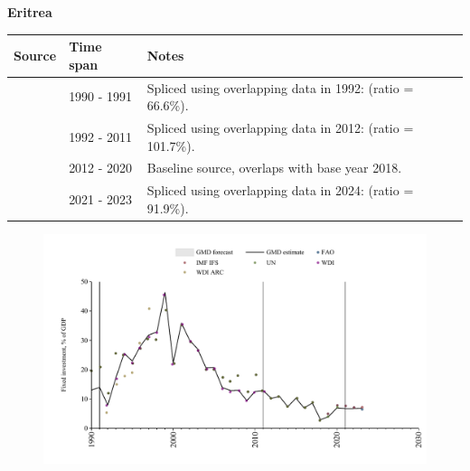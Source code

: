 \documentclass[12pt,a4paper,landscape]{article}
\begin{document}
\begin{adjustbox}{max totalsize={\paperwidth}{\paperheight},center}
\begin{minipage}[t][\textheight][t]{\textwidth}
\vspace*{0.5cm}
{}
\begin{center}
{\Large\bfseries Eritrea}
\end{center}
\vspace{0.5cm}
\begin{table}[H]
\centering
\small
\begin{tabular}{|l|l|l|}
\hline
\textbf{Source} & \textbf{Time span} & \textbf{Notes} \\
\hline
\rowcolor{white}\cite{UN}& 1990 - 1991 &Spliced using overlapping data in 1992: (ratio = 66.6\%).\\
\rowcolor{lightgray}\cite{WDI}& 1992 - 2011 &Spliced using overlapping data in 2012: (ratio = 101.7\%).\\
\rowcolor{white}\cite{UN}& 2012 - 2020 &Baseline source, overlaps with base year 2018.\\
\rowcolor{lightgray}\cite{IMF_IFS}& 2021 - 2023 &Spliced using overlapping data in 2024: (ratio = 91.9\%).\\
\hline
\end{tabular}
\end{table}
\begin{figure}[H]
\centering
\includegraphics[width=\textwidth,height=0.6\textheight,keepaspectratio]{graphs/ERI_finv_GDP.pdf}
\end{figure}
\end{minipage}
\end{adjustbox}
\end{document}
